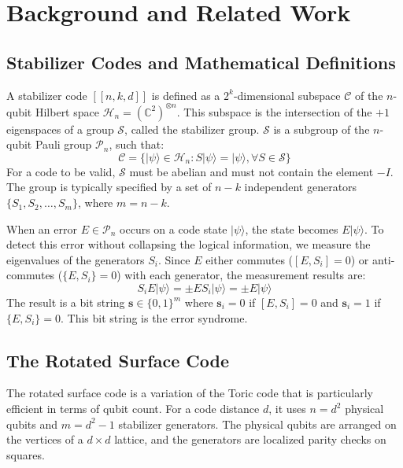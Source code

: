 \documentclass[journal,twocolumn]{IEEEtran}
\begin{document}
\section{Background and Related Work}

\subsection{Stabilizer Codes and Mathematical Definitions}

A stabilizer code $[[n, k, d]]$ is defined as a $2^k$-dimensional subspace $\mathcal{C}$ of the $n$-qubit Hilbert space $\mathcal{H}_n = (\mathbb{C}^2)^{\otimes n}$. This subspace is the intersection of the $+1$ eigenspaces of a group $\mathcal{S}$, called the stabilizer group. $\mathcal{S}$ is a subgroup of the $n$-qubit Pauli group $\mathcal{P}_n$, such that:
\begin{equation}
    \mathcal{C} = \{ |\psi\rangle \in \mathcal{H}_n : S |\psi\rangle = |\psi\rangle, \forall S \in \mathcal{S} \}
\end{equation}
For a code to be valid, $\mathcal{S}$ must be abelian and must not contain the element $-I$. The group is typically specified by a set of $n-k$ independent generators $\{S_1, S_2, \dots, S_{m}\}$, where $m = n-k$. 

When an error $E \in \mathcal{P}_n$ occurs on a code state $|\psi\rangle$, the state becomes $E|\psi\rangle$. To detect this error without collapsing the logical information, we measure the eigenvalues of the generators $S_i$. Since $E$ either commutes ($[E, S_i] = 0$) or anti-commutes ($\{E, S_i\} = 0$) with each generator, the measurement results are:
\begin{equation}
    S_i E |\psi\rangle = \pm E S_i |\psi\rangle = \pm E |\psi\rangle
\end{equation}
The result is a bit string $\mathbf{s} \in \{0, 1\}^m$ where $\mathbf{s}_i = 0$ if $[E, S_i] = 0$ and $\mathbf{s}_i = 1$ if $\{E, S_i\} = 0$. This bit string is the error syndrome.

\subsection{The Rotated Surface Code}

The rotated surface code is a variation of the Toric code that is particularly efficient in terms of qubit count. For a code distance $d$, it uses $n=d^2$ physical qubits and $m=d^2-1$ stabilizer generators. The physical qubits are arranged on the vertices of a $d \times d$ lattice, and the generators are localized parity checks on squares. 
\end{document}
